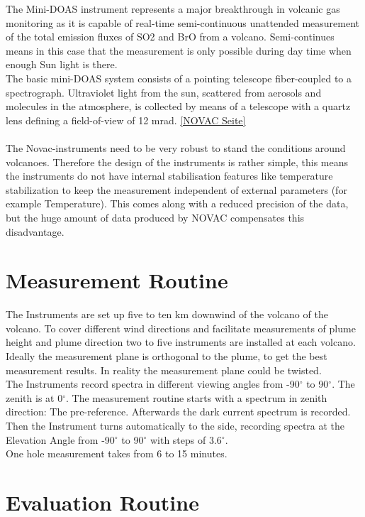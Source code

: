 \documentclass  [
  paper    = a4,
  BCOR     = 10mm,
  twoside,
  fontsize = 12pt,
  fleqn,
  toc      = bibnumbered,
  toc      = listofnumbered,
  numbers  = noendperiod,
  headings = normal,
  listof   = leveldown,
  version  = 3.03
]                                       {scrreprt}
\begin{document}
		The  Mini-DOAS  instrument  represents  a  major  breakthrough  in  volcanic  gas	monitoring as it is capable of real-time semi-continuous unattended measurement of the total emission fluxes of  SO2	and BrO from a volcano. Semi-continues means in this case that the measurement is only possible during day time when enough Sun light is there.\\
		The  basic  mini-DOAS  system  consists  of  a  pointing  telescope  fiber-coupled  to  a  spectrograph.  
		Ultraviolet light from the sun, scattered from aerosols and molecules in the atmosphere, is collected by 
		means  of  a  telescope  with  a  quartz  lens  defining  a  field-of-view  of  12  mrad. \ref{NOVAC Seite} \\
		\\
 		The Novac-instruments need to be very robust to stand the conditions around volcanoes. Therefore the design of the instruments is rather simple, this means the instruments do not have internal stabilisation features like temperature stabilization to keep the measurement independent of external parameters (for example Temperature).
		This comes along with a reduced precision of the data, but the huge amount of data produced by NOVAC compensates this disadvantage.  
	
	
	\chapter{Measurement Routine}
	The Instruments are set up five to ten km downwind of the volcano of the volcano. To cover different wind directions and  facilitate measurements of plume height and plume direction two to five instruments are installed at each volcano. Ideally the measurement plane is orthogonal to the plume, to get the best measurement results. In reality the measurement plane could be twisted.\\
	The Instruments record spectra in different viewing angles from 
	-90$^{\circ}$ to 90$^{\circ}$. The zenith is at 0$^{\circ}$.
	The measurement routine starts with a spectrum in zenith direction: The pre-reference.
	Afterwards the dark current spectrum is recorded.\\
	Then the Instrument turns automatically to the side, recording spectra at the Elevation Angle from -90$^{\circ}$ to 90$^{\circ}$ with steps of 3.6$^{\circ}$. \\
	One hole measurement takes from 6 to 15 minutes.
	\chapter{Evaluation Routine}
\end{document}
